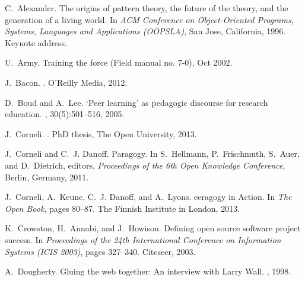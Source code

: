 \documentclass{acm_proc_article-sp}
\begin{document}

% 

\begin{thebibliography}{10}

C.~Alexander.
\newblock The origins of pattern theory, the future of the theory, and the
  generation of a living world.
\newblock In {\em {A}{C}{M} {C}onference on {O}bject-{O}riented {P}rograms,
  {S}ystems, {L}anguages and {A}pplications ({O}{O}{P}{S}{L}{A})}, San Jose,
  California, 1996.
\newblock Keynote address.

U.~Army.
\newblock Training the force {(Field} manual no. 7-0), Oct 2002.

J.~Bacon.
.
\newblock O'Reilly Media, 2012.

D.~Boud and A.~Lee.
\newblock `{P}eer learning' as pedagogic discourse for research education.
, 30(5):501--516, 2005.

J.~Corneli.
.
\newblock PhD thesis, The Open University, 2013.

J.~Corneli and C.~J. Danoff.
\newblock Paragogy.
\newblock In S.~Hellmann, P.~Frischmuth, S.~Auer, and D.~Dietrich, editors,
  {\em Proceedings of the 6th Open Knowledge Conference}, Berlin, Germany,
  2011.

J.~Corneli, A.~Keune, C.~J. Danoff, and A.~Lyons.
eeragogy in {A}ction.
\newblock In {\em The Open Book}, pages 80--87. The Finnish Institute in
  London, 2013.

K.~Crowston, H.~Annabi, and J.~Howison.
\newblock Defining open source software project success.
\newblock In {\em Proceedings of the 24th {I}nternational {C}onference on
  {I}nformation {S}ystems ({I}{C}{I}{S} 2003)}, pages 327--340. Citeseer, 2003.

A.~Dougherty.
\newblock Gluing the web together: An interview with {L}arry {W}all.
, 1998.


\end{thebibliography}
\end{document}
